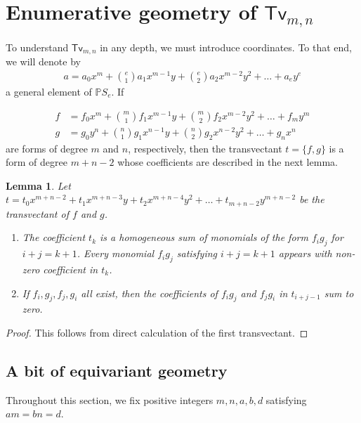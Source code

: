\documentclass[reqno, 11pt]{amsart}
\theoremstyle{plain}
\newtheorem{lemma}[theorem]{Lemma}
\theoremstyle{remark}
\renewcommand{\P}{\mathbb{P}}
\newcommand{\transvectant}{\mathsf{Tv}}
\begin{document}
\section{Enumerative geometry of $\transvectant_{m,n}$}
\label{section:enumerative}

To understand $\transvectant_{m,n}$ in any depth, we must introduce coordinates.  To that end, we will denote by 
\begin{align*}
    a = a_{0}x^{m} + {e \choose 1} a_{1}x^{m-1}y + {e \choose 2} a_{2}x^{m-2}y^{2} + \dots + a_{e}y^{e}
\end{align*} a general element of $\P S_{e}$.  If 

\begin{align*}
f &= f_{0}x^{m} + {m \choose 1} f_{1}x^{m-1}y + {m \choose 2} f_{2}x^{m-2}y^{2} + \dots + f_{m}y^{m}\\
g &= g_{0}y^{n} + {n \choose 1} g_{1}x^{n-1}y + {n \choose 2} g_{2}x^{n-2}y^{2} + \dots + g_{n}x^{n}
\end{align*}
are forms of degree $m$ and $n$, respectively, then the transvectant $t = \{f,g\}$ is a form of degree $m+n-2$ whose coefficients are described in the next lemma.

\begin{lemma}
    \label{lemma:transvectantcoefficients}
    Let $t = t_{0}x^{m+n-2} +  t_{1}x^{m+n-3}y + t_{2}x^{m+n-4}y^{2} + \dots + t_{m+n-2}y^{m+n-2}$ be the transvectant of $f$ and $g$. 
    \begin{enumerate}   
        \item The coefficient $t_k$ is a homogeneous sum of monomials of the form $f_i g_j$ for $i+j = k+1$. Every monomial $f_i g_j$ satisfying $i+j = k+1$ appears with non-zero coefficient in $t_k$.
        \item If $f_i, g_j, f_j, g_i$ all exist, then the coefficients of $f_i g_j$ and $f_j g_i$ in $t_{i+j-1}$ sum to zero.
    \end{enumerate}
\end{lemma}

\begin{proof}
    This follows from direct calculation of the first transvectant.
\end{proof}


\subsection{A bit of equivariant geometry}
\label{subsection:equivariant}

Throughout this section, we fix positive integers $m,n,a,b,d$ satisfying $am = bn = d$.
\end{document}
